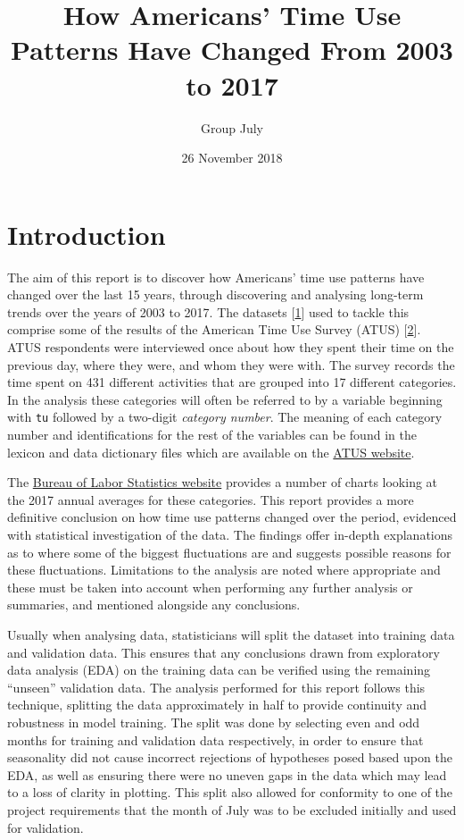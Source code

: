 \documentclass[11pt,]{article}
\title{\textbf{How Americans' Time Use Patterns Have Changed From 2003 to 2017}}
\subtitle{Group July}
\author{}
\date{26 November 2018}
\begin{document}
\maketitle

\hypertarget{introduction}{%
\section{Introduction}\label{introduction}}

The aim of this report is to discover how Americans' time use patterns
have changed over the last 15 years, through discovering and analysing
long-term trends over the years of 2003 to 2017. The datasets
{[}\protect\hyperlink{ref-atusdatasets}{1}{]} used to tackle this
comprise some of the results of the American Time Use Survey (ATUS)
{[}\protect\hyperlink{ref-ATUS}{2}{]}. ATUS respondents were interviewed
once about how they spent their time on the previous day, where they
were, and whom they were with. The survey records the time spent on 431
different activities that are grouped into 17 different categories. In
the analysis these categories will often be referred to by a variable
beginning with \texttt{tu} followed by a two-digit \emph{category
number}. The meaning of each category number and identifications for the
rest of the variables can be found in the lexicon and data dictionary
files which are available on the
\href{https://www.bls.gov/tus/lexiconnoex0317.pdf}{ATUS website}.

The \href{https://www.bls.gov/tus/charts.htm}{Bureau of Labor Statistics
website} provides a number of charts looking at the 2017 annual averages
for these categories. This report provides a more definitive conclusion
on how time use patterns changed over the period, evidenced with
statistical investigation of the data. The findings offer in-depth
explanations as to where some of the biggest fluctuations are and
suggests possible reasons for these fluctuations. Limitations to the
analysis are noted where appropriate and these must be taken into
account when performing any further analysis or summaries, and mentioned
alongside any conclusions.

Usually when analysing data, statisticians will split the dataset into
training data and validation data. This ensures that any conclusions
drawn from exploratory data analysis (EDA) on the training data can be
verified using the remaining ``unseen'' validation data. The analysis
performed for this report follows this technique, splitting the data
approximately in half to provide continuity and robustness in model
training. The split was done by selecting even and odd months for
training and validation data respectively, in order to ensure that
seasonality did not cause incorrect rejections of hypotheses posed based
upon the EDA, as well as ensuring there were no uneven gaps in the data
which may lead to a loss of clarity in plotting. This split also allowed
for conformity to one of the project requirements that the month of July
was to be excluded initially and used for validation.
\end{document}
